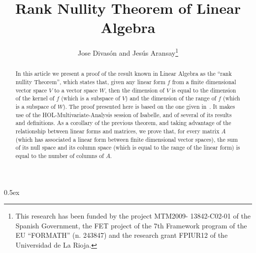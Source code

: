 \documentclass[11pt,a4paper]{article}
\title{Rank Nullity Theorem of Linear Algebra}
\author{Jose Divasón and Jesús Aransay\thanks{This research has been funded by the project MTM2009-
13842-C02-01 of the Spanish Government, the FET project of the 7th Framework program of the EU 
``FORMATH'' (n. 243847) and the research grant FPIUR12 of the Universidad de La Rioja.}}
\begin{document}
\maketitle

\begin{abstract}

In this article we present a proof of the result known in Linear Algebra as the ``rank nullity Theorem'',
which states that, given any linear form $f$ from a finite dimensional vector space $V$ to a 
vector space $W$, then the dimension of $V$ is equal to the dimension of the kernel of $f$ (which is
a subspace of $V$) and the dimension of the range of $f$ (which is a subspace of $W$). The proof presented
here is based on the one given in~\cite{AX97}. It makes use of the HOL-Multivariate-Analysis session of Isabelle,
and of several of its results and definitions. As a corollary of the previous theorem, and taking advantage 
of the relationship between linear forms and matrices, we prove that, for every matrix $A$ (which has associated a
linear form between finite dimensional vector spaces), the sum of its null space 
and its column space (which is equal to the range of the linear form) is equal 
to the number of columns of $A$.

\end{abstract}


\tableofcontents

\parindent 0pt\parskip 0.5ex





\end{document}
